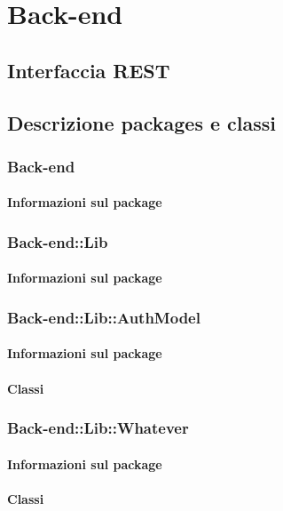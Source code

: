 \section{Back-end}
	\subsection{Interfaccia REST}

	\subsection{Descrizione packages e classi}
	
		\subsubsection{Back-end}
		\paragraph{Informazioni sul package}
	
		\subsubsection{Back-end::Lib}
		\paragraph{Informazioni sul package}
		
		\subsubsection{Back-end::Lib::AuthModel}
		\paragraph{Informazioni sul package}
		\paragraph{Classi}
		
		\subsubsection{Back-end::Lib::Whatever}
		\paragraph{Informazioni sul package}
		\paragraph{Classi}
	

